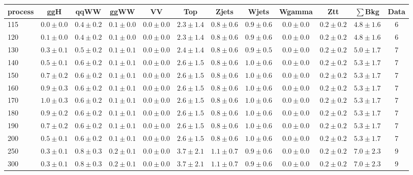\begin{table}[!hb]
{\footnotesize
 \begin{center}
 \begin{tabular}{l c c c c c c c c c c c }
 \hline
 process & ggH & qqWW & ggWW & VV & Top & Zjets & Wjets & Wgamma & Ztt & $\sum$Bkg & Data \\
 \hline
115 & $0.0\pm0.0$ & $0.4\pm0.2$ & $0.1\pm0.0$ & $0.0\pm0.0$ & $2.3\pm1.4$ & $0.8\pm0.6$ & $0.9\pm0.6$ & $0.0\pm0.0$ & $0.2\pm0.2$ & $4.8\pm1.6$ & 6 \\
120 & $0.1\pm0.0$ & $0.4\pm0.2$ & $0.1\pm0.0$ & $0.0\pm0.0$ & $2.3\pm1.4$ & $0.8\pm0.6$ & $0.9\pm0.6$ & $0.0\pm0.0$ & $0.2\pm0.2$ & $4.8\pm1.6$ & 6 \\
130 & $0.3\pm0.1$ & $0.5\pm0.2$ & $0.1\pm0.1$ & $0.0\pm0.0$ & $2.4\pm1.4$ & $0.8\pm0.6$ & $0.9\pm0.5$ & $0.0\pm0.0$ & $0.2\pm0.2$ & $5.0\pm1.7$ & 7 \\
140 & $0.5\pm0.1$ & $0.6\pm0.2$ & $0.1\pm0.1$ & $0.0\pm0.0$ & $2.6\pm1.5$ & $0.8\pm0.6$ & $1.0\pm0.6$ & $0.0\pm0.0$ & $0.2\pm0.2$ & $5.3\pm1.7$ & 7 \\
150 & $0.7\pm0.2$ & $0.6\pm0.2$ & $0.1\pm0.1$ & $0.0\pm0.0$ & $2.6\pm1.5$ & $0.8\pm0.6$ & $1.0\pm0.6$ & $0.0\pm0.0$ & $0.2\pm0.2$ & $5.3\pm1.7$ & 7 \\
160 & $0.9\pm0.3$ & $0.6\pm0.2$ & $0.1\pm0.1$ & $0.0\pm0.0$ & $2.6\pm1.5$ & $0.8\pm0.6$ & $1.0\pm0.6$ & $0.0\pm0.0$ & $0.2\pm0.2$ & $5.3\pm1.7$ & 7 \\
170 & $1.0\pm0.3$ & $0.6\pm0.2$ & $0.1\pm0.1$ & $0.0\pm0.0$ & $2.6\pm1.5$ & $0.8\pm0.6$ & $1.0\pm0.6$ & $0.0\pm0.0$ & $0.2\pm0.2$ & $5.3\pm1.7$ & 7 \\
180 & $0.9\pm0.2$ & $0.6\pm0.2$ & $0.1\pm0.1$ & $0.0\pm0.0$ & $2.6\pm1.5$ & $0.8\pm0.6$ & $1.0\pm0.6$ & $0.0\pm0.0$ & $0.2\pm0.2$ & $5.3\pm1.7$ & 7 \\
190 & $0.7\pm0.2$ & $0.6\pm0.2$ & $0.1\pm0.1$ & $0.0\pm0.0$ & $2.6\pm1.5$ & $0.8\pm0.6$ & $1.0\pm0.6$ & $0.0\pm0.0$ & $0.2\pm0.2$ & $5.3\pm1.7$ & 7 \\
200 & $0.5\pm0.1$ & $0.6\pm0.2$ & $0.1\pm0.1$ & $0.0\pm0.0$ & $2.6\pm1.5$ & $0.8\pm0.6$ & $1.0\pm0.6$ & $0.0\pm0.0$ & $0.2\pm0.2$ & $5.3\pm1.7$ & 7 \\
250 & $0.3\pm0.1$ & $0.8\pm0.3$ & $0.2\pm0.1$ & $0.0\pm0.0$ & $3.7\pm2.1$ & $1.1\pm0.7$ & $0.9\pm0.6$ & $0.0\pm0.0$ & $0.2\pm0.2$ & $7.0\pm2.3$ & 9 \\
300 & $0.3\pm0.1$ & $0.8\pm0.3$ & $0.2\pm0.1$ & $0.0\pm0.0$ & $3.7\pm2.1$ & $1.1\pm0.7$ & $0.9\pm0.6$ & $0.0\pm0.0$ & $0.2\pm0.2$ & $7.0\pm2.3$ & 9 \\

\end{tabular}
\end{center}}
\end{table}
